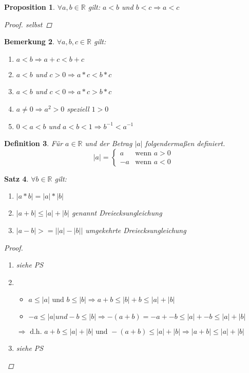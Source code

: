 \documentclass[a4paper,titlepage,oneside]{article}
\def\R{\ensuremath{\mathbb{R}} }
\newcommand{\fain}[2]{\ensuremath{\forall#1\in#2}}
\newcommand{\abs}[1]{\ensuremath{\left|#1\right|}}
\theoremstyle{thmstyle}
\newtheorem{satz}{Satz}[subsection]
\newtheorem{prop}[satz]{Proposition}
\newtheorem{defi}[satz]{Definition}
\newtheorem{bem}[satz]{Bemerkung}
\begin{document}
\begin{prop}
\fain{a, b}{\R} gilt: $a < b$ und $b < c \Rightarrow a < c$
\begin{proof}
selbst  %
\end{proof}
\end{prop}

\begin{bem}
\fain{a, b, c}{\R} gilt:
\begin{enumerate}[label=\alph*)]
\item $a < b \Rightarrow a + c < b + c$
\item $a < b$ und $c > 0 \Rightarrow a * c < b * c$
\item $a < b$ und $c < 0 \Rightarrow a * c > b * c$
\item $a \ne 0 \Rightarrow a^2 > 0$  speziell $1 > 0$
\item $0 < a < b$ und $a < b < 1 \Rightarrow b^{-1} < a^{-1}$
\end{enumerate}
\end{bem}

\begin{defi}
Für $a \in \R$ und der Betrag \abs{a} folgendermaßen definiert. 
\[\abs{a} = \begin{cases}
 a & \text{wenn } a > 0\\
-a & \text{wenn } a < 0
\end{cases}\]
\end{defi}

\begin{satz}
\fain{ b}{ \R} gilt:
\begin{enumerate}[label=(\arabic*)]
\item $\abs{a * b} = \abs{a} * \abs{b}$
\item $\abs{a + b} \le \abs{a} + \abs{b} $ genannt Dreiecksungleichung
\item $\abs{a - b} >= \abs{\abs{a} - \abs{b}}$ umgekehrte Dreiecksungleichung
\end{enumerate}
\begin{proof}
\begin{enumerate}[label=(\arabic*)]
\item siehe PS
\item 
\begin{itemize}
\item $a \le \abs{a} \text{ und } b \le \abs{b} \Rightarrow a + b \le \abs{b} + b \le \abs{a}+\abs{b} $
\item $-a \le \abs{a} und -b \le \abs{b}  \Rightarrow -(a + b) = -a + -b \le \abs{a} + -b \le \abs{a} +\abs{b}  $
\end{itemize}
$\Rightarrow \text{ d.h. } a + b \le \abs{a} + \abs{b}  \text{ und } -(a + b) \le \abs{a} + \abs{b}  \Rightarrow \abs{a + b} \le \abs{a} + \abs{b} $
\item siehe PS
\end{enumerate}
\end{proof}
\end{satz}
\end{document}
